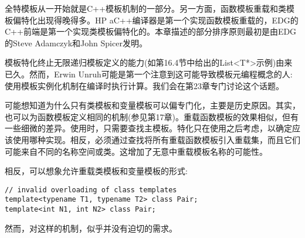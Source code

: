 全特模板从一开始就是C++模板机制的一部分。另一方面，函数模板重载和类模板偏特化出现得晚得多。HP aC++编译器是第一个实现函数模板重载的，EDG的C++前端是第一个实现类模板偏特化的。本章描述的部分排序原则最初是由EDG的Steve Adamczyk和John Spicer发明。

模板特化终止无限递归模板定义的能力(如第16.4节中给出的List<T*>示例)由来已久。然而，Erwin Unruh可能是第一个注意到这可能导致模板元编程概念的人:使用模板实例化机制在编译时执行计算。我们会在第23章专门讨论这个话题。

可能想知道为什么只有类模板和变量模板可以偏专门化，主要是历史原因。其实，也可以为函数模板定义相同的机制(参见第17章)。重载函数模板的效果相似，但有一些细微的差异。使用时，只需要查找主模板。特化只在使用之后考虑，以确定应该使用哪种实现。相反，必须通过查找将所有重载函数模板引入重载集，而且它们可能来自不同的名称空间或类。这增加了无意中重载模板名称的可能性。

相反，可以想象允许重载类模板和变量模板的形式:

\begin{lstlisting}[style=styleCXX]
// invalid overloading of class templates
template<typename T1, typename T2> class Pair;
template<int N1, int N2> class Pair;
\end{lstlisting}

然而，对这样的机制，似乎并没有迫切的需求。